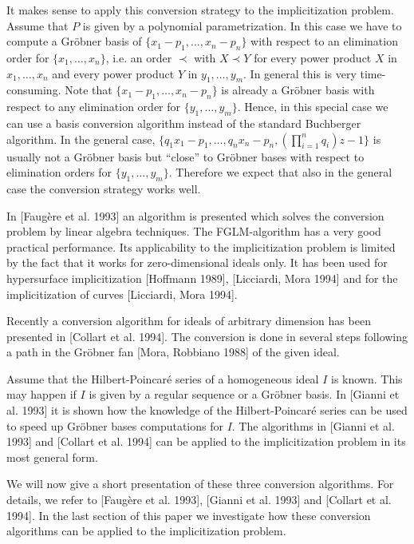 It makes sense to apply this conversion strategy to the implicitization
problem. Assume that $P$ is given by a polynomial parametrization.
In this case we have to compute a Gr\"obner basis of 
$\{x_1-p_1,\ldots,x_n-p_n\}$
with respect to an elimination order for $\{x_1,\ldots,x_n\}$, i.e.
an order $\prec$
with $X\prec Y$ for every power product
$X$ in $x_1,\ldots,x_n$ and every power
product $Y$ in $y_1,\ldots,y_m$. 
In general this is very time-consuming. Note that 
$\{x_1-p_1,\ldots,x_n-p_n\}$ is already a Gr\"obner basis 
with respect to any elimination order for $\{y_1,\ldots,y_m\}$. 
Hence, in this special case we can use a basis conversion 
algorithm instead of the standard Buchberger algorithm. In the general
case,
$\{q_1x_1-p_1,\ldots,q_nx_n-p_n,(\prod_{i=1}^n q_i)z-1\}$
is usually not a Gr\"obner basis 
but ``close'' to Gr\"obner bases 
with respect to elimination orders for $\{y_1,\ldots,y_m\}$. 
Therefore we expect that also in the general case the conversion
strategy works well.
 
In [Faug{\`e}re et al. 1993]
an algorithm is presented 
which solves the conversion problem by linear algebra techniques.
The FGLM-algorithm  
has a very good practical performance. Its applicability to
the implicitization problem is limited by the fact that it works
for zero-dimensional ideals only. It has been used for hypersurface
implicitization [Hoffmann 1989], [Licciardi, Mora 1994] and for
the implicitization of curves [Licciardi, Mora 1994].

Recently a conversion algorithm for ideals of arbitrary dimension has
been presented in [Collart et al. 1994]. 
The conversion is done in several steps following a
path in the Gr\"obner fan [Mora, Robbiano 1988] of the given ideal. 

Assume that the Hilbert-Poincar\'e series of a homogeneous ideal $I$ is
known. This may happen if $I$ is given by a regular sequence or a Gr\"obner
basis. In [Gianni et al. 1993] it is shown how the knowledge of the
Hilbert-Poincar\'e series can be used to speed up Gr\"obner bases 
computations for $I$. The algorithms in [Gianni et al. 1993] and
[Collart et al. 1994]
can be applied to the implicitization problem in its most
general form. 

We will now give a short presentation of these three conversion
algorithms. For details, we refer to [Faug{\`e}re et al. 1993], 
[Gianni et al. 1993] and
[Collart et al. 1994]. In the last section of this paper
we investigate how these conversion 
algorithms can be applied 
to the implicitization problem.

